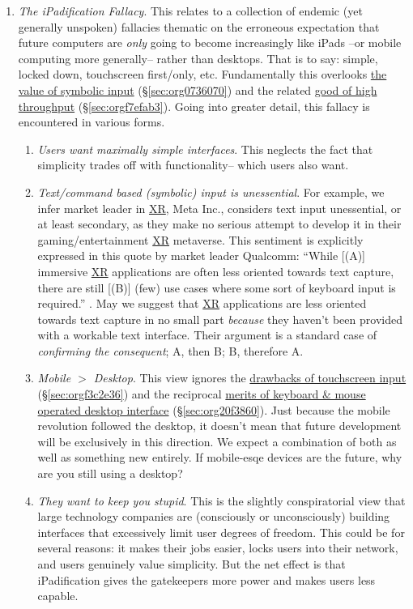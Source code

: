 \documentclass[logo,bsc,singlespacing,parskip]{infthesis}
\begin{document}
\begin{enumerate}
\item \emph{The iPadification Fallacy}.\label{ipadification fallacy}
This relates to a collection of endemic (yet generally unspoken) fallacies thematic on the erroneous expectation that future computers are \emph{only} going to become increasingly like iPads --or mobile computing more generally-- rather than desktops.
That is to say: simple, locked down, touchscreen first/only, etc.
Fundamentally this overlooks \hyperref[sec:org0736070]{the value of symbolic input} (\S \ref{sec:org0736070}) and the related \hyperref[sec:orgf7efab3]{good of high throughput} (\S \ref{sec:orgf7efab3}).
Going into greater detail, this fallacy is encountered in various forms.
\begin{enumerate}
\item \emph{Users want maximally simple interfaces}.
This neglects the fact that simplicity trades off with functionality-- which users also want.
\item \emph{Text/command based (symbolic) input is unessential}.
For example, we infer market leader in \hyperref[org39cbd51]{XR},  Meta Inc., considers text input unessential, or at least secondary, as they make no serious attempt to develop it in their gaming/entertainment \hyperref[org39cbd51]{XR} metaverse.
This sentiment is explicitly expressed in this quote by market leader Qualcomm: ``While [(A)] immersive \hyperref[org39cbd51]{XR} applications are often less oriented towards text capture, there are still [(B)] (few) use cases where some sort of keyboard input is required.'' \autocite{qualcommXRUserInterfaces}.
May we suggest that \hyperref[org39cbd51]{XR} applications are less oriented towards text capture in no small part \emph{because} they haven't been provided with a workable text interface.
Their argument is a standard case of \emph{confirming the consequent}; A, then B; B, therefore A.
\item \emph{Mobile \(>\) Desktop}.
This view ignores the \hyperref[sec:orgf3c2e36]{drawbacks of touchscreen input} (\S \ref{sec:orgf3c2e36}) and the reciprocal \hyperref[sec:org20f3860]{merits of keyboard \& mouse operated desktop interface} (\S \ref{sec:org20f3860}).
Just because the mobile revolution followed the desktop, it doesn't mean that future development will be exclusively in this direction.
We expect a combination of both as well as something new entirely.
If mobile-esqe devices are the future, why are you still using a desktop?
\item \emph{They want to keep you stupid}.
This is the slightly conspiratorial view that large technology companies are (consciously or unconsciously) building interfaces that excessively limit user degrees of freedom.
This could be for several reasons: it makes their jobs easier, locks users into their network, and users genuinely value simplicity.
But the net effect is that iPadification gives the gatekeepers more power and makes users less capable.
\end{enumerate}


\end{enumerate}
\end{document}
